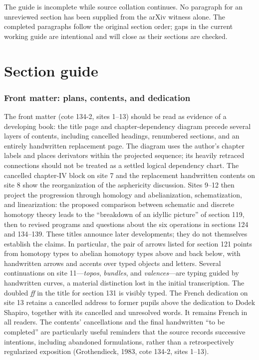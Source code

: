 \documentclass[10pt,oneside]{book}
\begin{document}
The guide is incomplete while source collation continues. No paragraph for an unreviewed section has been supplied from the arXiv witness alone. The completed paragraphs follow the original section order; gaps in the current working guide are intentional and will close as their sections are checked.
\chapter*{Section guide}
\subsection*{Front matter: plans, contents, and dedication}
The front matter (cote 134-2, sites 1--13) should be read as evidence of a developing book: the title page and chapter-dependency diagram precede several layers of contents, including cancelled headings, renumbered sections, and an entirely handwritten replacement page. The diagram uses the author's chapter labels and places derivators within the projected sequence; its heavily retraced connections should not be treated as a settled logical dependency chart. The cancelled chapter-IV block on site 7 and the replacement handwritten contents on site 8 show the reorganization of the asphericity discussion. Sites 9--12 then project the progression through homology and abelianization, schematization, and linearization: the proposed comparison between schematic and discrete homotopy theory leads to the ``breakdown of an idyllic picture'' of section 119, then to revised programs and questions about the six operations in sections 124 and 134--139. These titles announce later developments; they do not themselves establish the claims. In particular, the pair of arrows listed for section 121 points from homotopy types to abelian homotopy types above and back below, with handwritten arrows and accents over typed objects and letters. Several continuations on site 11---\emph{topos}, \emph{bundles}, and \emph{valences}---are typing guided by handwritten curves, a material distinction lost in the initial transcription. The doubled \emph{ff} in the title for section 131 is visibly typed. The French dedication on site 13 retains a cancelled address to former pupils above the dedication to Dodek Shapiro, together with its cancelled and unresolved words. It remains French in all readers. The contents' cancellations and the final handwritten ``to be completed'' are particularly useful reminders that the source records successive intentions, including abandoned formulations, rather than a retrospectively regularized exposition (Grothendieck, 1983, cote 134-2, sites 1--13).
\end{document}
